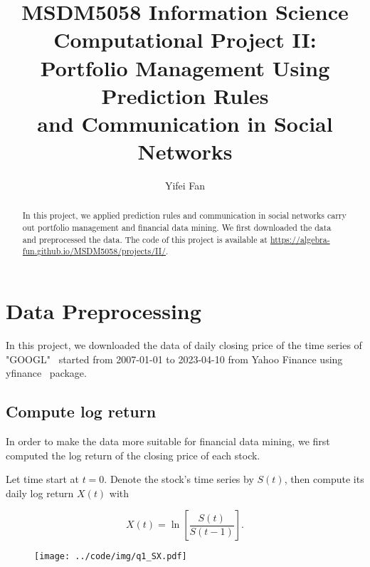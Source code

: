 \documentclass[runningheads]{llncs}
\begin{document}
\title{MSDM5058 Information Science\\
    Computational Project II:\\
    Portfolio Management Using Prediction Rules\\
    and Communication in Social Networks}
\author{Yifei Fan}
\maketitle

\begin{abstract}
    In this project, we applied prediction rules and communication in social networks carry out portfolio management and financial data mining.
    We first downloaded the data and preprocessed the data.
    The code of this project is available at \url{https://algebra-fun.github.io/MSDM5058/projects/II/}.
\end{abstract}


\section{Data Preprocessing}\label{sec:1}

In this project, we downloaded the data of
daily closing price of the time series of "GOOGL"~\cite{goolge}
started from 2007-01-01 to 2023-04-10 from Yahoo Finance
using yfinance~\cite{yfinance} package.
\subsection{Compute log return}
In order to make the data more suitable for financial data mining,
we first computed the log return of the closing price of each stock.

Let time start at $t = 0$. Denote the stock's time series by $S(t)$, then compute its daily log return $X(t)$ with

\begin{equation}
    X(t)=\ln \left[\frac{S(t)}{S(t-1)}\right].
\end{equation}

\begin{figure}[!htbp]
    \begin{center}
        \texttt{[image: ../code/img/q1\_SX.pdf]}
    \end{center}
    \caption{}
    \label{fig:q1sx}
\end{figure}
\end{document}
